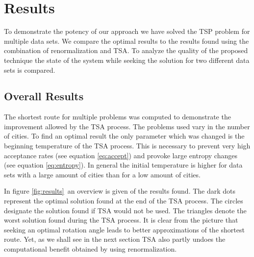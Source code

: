 \section{Results}
To demonstrate the potency of our approach we have solved the TSP problem for
multiple data sets. We compare the optimal results to the results found using
the combination of renormalization and TSA. To analyze the quality of the
proposed technique the state of the system while seeking the solution for two
different data sets is compared.

\subsection{Overall Results}
The shortest route for multiple problems was computed to demonstrate the
improvement allowed by the TSA process. The problems used vary in
the number of cities. To find an optimal result the only parameter which was
changed is the beginning temperature of the TSA process. This
is necessary to prevent very high acceptance rates (see equation
\ref{eq:accept}) and provoke large entropy changes (see equation
\ref{eq:entropy}). In general the initial temperature is higher for data sets
with a large amount of cities than for a low amount of cities.

In figure \ref{fig:results}~an overview is given of the results found. The
dark dots represent the optimal solution found at the end of the TSA process.
The circles designate the solution found if TSA would not be used. The
triangles denote the worst solution found during the TSA process. It is clear
from the picture that seeking an optimal rotation angle leads to better
approximations of the shortest route. Yet, as we shall see in the next section
TSA also partly undoes the computational benefit obtained by using renormalization.


